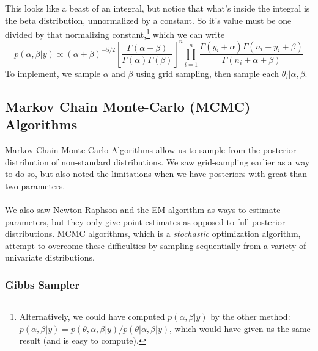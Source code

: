 \documentclass[12pt]{article}
\theoremstyle{plain}
\theoremstyle{definition}
\theoremstyle{remark}
\begin{document}
This looks like a beast of an integral, but notice that what's inside
the integral is the beta distribution, unnormalized by a constant. So
it's value must be one divided by that normalizing constant,\footnote{
Alternatively, we could have computed $p(\alpha, \beta |y)$
by the other method: $p(\alpha, \beta | y) =
p(\theta, \alpha, \beta | y)/p(\theta|\alpha, \beta | y)$, which
would have given us the same result (and is easy
to compute).} which we can write
\[ p(\alpha, \beta | y) \propto (\alpha + \beta)^{-5/2}
   \left[\frac{\Gamma(\alpha+\beta)}{\Gamma(\alpha) \Gamma(\beta)}
      \right]^n  \prod^n_{i=1} \frac{ \Gamma(y_i + \alpha) \Gamma(
      n_i - y_i + \beta)}{\Gamma(n_i + \alpha + \beta)} \]
To implement, we sample $\alpha$ and $\beta$ using grid sampling,
then sample each $\theta_i | \alpha, \beta$.

\newpage
\subsection{Markov Chain Monte-Carlo (MCMC) Algorithms}

Markov Chain Monte-Carlo Algorithms allow us to sample from the
posterior distribution of non-standard distributions. We saw
grid-sampling earlier as a way to do so, but also noted the limitations
when we have posteriors with great than two parameters.
\\
\\
We also saw Newton Raphson and the EM algorithm as ways to estimate
parameters, but they only give point estimates as opposed to full
posterior distributions.  MCMC algorithms, which is a \emph{stochastic}
optimization algorithm, attempt to overcome these difficulties
by sampling sequentially from a variety of univariate distributions.

\subsubsection{Gibbs Sampler}
\end{document}
